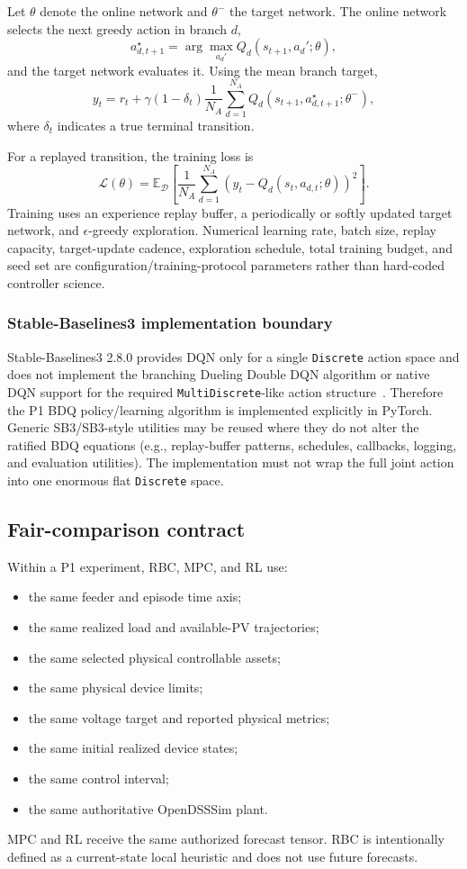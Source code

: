 Let $\theta$ denote the online network and $\theta^{-}$ the target network.  The online
network selects the next greedy action in branch $d$,
\[
a_{d,t+1}^{\star}
=
\arg\max_{a_d'}
Q_d(s_{t+1},a_d';\theta),
\]
and the target network evaluates it.  Using the mean branch target,
\[
\boxed{
y_t
=
r_t
+
\gamma(1-\delta_t)
\frac{1}{N_A}
\sum_{d=1}^{N_A}
Q_d
\left(
s_{t+1},
a_{d,t+1}^{\star};
\theta^{-}
\right),
}
\]
where $\delta_t$ indicates a true terminal transition.

For a replayed transition, the training loss is
\[
\boxed{
\mathcal L(\theta)
=
\mathbb E_{\mathcal D}
\left[
\frac{1}{N_A}
\sum_{d=1}^{N_A}
\left(
y_t
-
Q_d(s_t,a_{d,t};\theta)
\right)^2
\right].
}
\]
Training uses an experience replay buffer, a periodically or softly updated target
network, and $\epsilon$-greedy exploration.  Numerical learning rate, batch size, replay
capacity, target-update cadence, exploration schedule, total training budget, and seed
set are configuration/training-protocol parameters rather than hard-coded controller
science.

\subsubsection{Stable-Baselines3 implementation boundary}

Stable-Baselines3 2.8.0 provides DQN only for a single \texttt{Discrete} action space and
does not implement the branching Dueling Double DQN algorithm or native DQN support for
the required \texttt{MultiDiscrete}-like action structure~\cite{sb3_280}.  Therefore the
P1 BDQ policy/learning algorithm is implemented explicitly in PyTorch.  Generic
SB3/SB3-style utilities may be reused where they do not alter the ratified BDQ equations
(e.g., replay-buffer patterns, schedules, callbacks, logging, and evaluation utilities).
The implementation must not wrap the full joint action into one enormous flat
\texttt{Discrete} space.

\subsection{Fair-comparison contract}
\label{subsec:p1_fairness}

Within a P1 experiment, RBC, MPC, and RL use:
\begin{itemize}
    \item the same feeder and episode time axis;
    \item the same realized load and available-PV trajectories;
    \item the same selected physical controllable assets;
    \item the same physical device limits;
    \item the same voltage target and reported physical metrics;
    \item the same initial realized device states;
    \item the same control interval;
    \item the same authoritative OpenDSSSim plant.
\end{itemize}
MPC and RL receive the same authorized forecast tensor.  RBC is intentionally defined as a
current-state local heuristic and does not use future forecasts.

